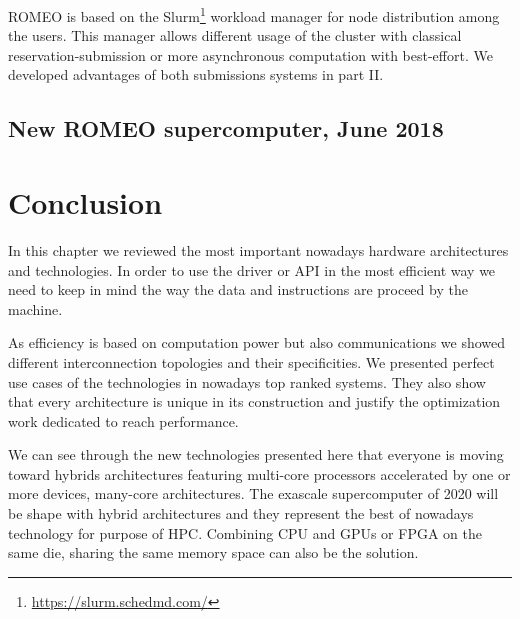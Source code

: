 ROMEO is based on the Slurm\footnote{\url{https://slurm.schedmd.com/}} workload manager for node distribution among the users. 
This manager allows different usage of the cluster with classical reservation-submission or more asynchronous computation with best-effort. 
We developed advantages of both submissions systems in part II. 

\subsection{New ROMEO supercomputer, June 2018}


\section{Conclusion}

In this chapter we reviewed the most important nowadays hardware architectures and technologies. 
In order to use the driver or API in the most efficient way we need to keep in mind the way the data and instructions are proceed by the machine. 

As efficiency is based on computation power but also communications we showed different interconnection topologies and their specificities. 
We presented perfect use cases of the technologies in nowadays top ranked systems.
They also show that every architecture is unique in its construction and justify the optimization work dedicated to reach performance. 

We can see through the new technologies presented here that everyone is moving toward hybrids architectures featuring multi-core processors accelerated by one or more devices, many-core architectures. 
The exascale supercomputer of 2020 will be shape with hybrid architectures and they represent the best of nowadays technology for purpose of HPC. 
Combining CPU and GPUs or FPGA on the same die, sharing the same memory space can also be the solution.
